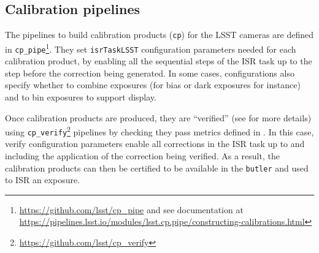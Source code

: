 \subsection{Calibration pipelines}
\label{sec:calib_pipe}

The pipelines to build calibration products (\texttt{cp}) for the LSST cameras are defined in \texttt{cp\_pipe}\footnote{\url{https://github.com/lsst/cp\_pipe} and see documentation at \url{https://pipelines.lsst.io/modules/lsst.cp.pipe/constructing-calibrations.html}}.
They set \texttt{isrTaskLSST} configuration parameters needed for each calibration product, by enabling all the sequential steps of the ISR task up to the step before the correction being generated. In some cases, configurations also specify whether to combine exposures (for bias or dark exposures for instance) and to bin exposures to support display.

Once calibration products are produced, they are ``verified'' (see \citet{DMTN-222} for more details) using \texttt{cp\_verify}\footnote{\url{https://github.com/lsst/cp\_verify}} pipelines by checking they pass metrics defined in \citet{DMTN-101}.
In this case, verify configuration parameters enable all corrections in the ISR task up to and including the application of the correction being verified. As a result, the calibration products can then be certified to be available in the \texttt{butler} and used to ISR an exposure.
